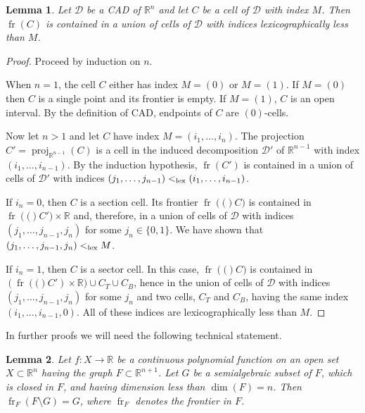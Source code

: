 \documentclass[
]{book}
\newtheorem{lemma}{Lemma}[chapter]
\theoremstyle{definition}
\theoremstyle{definition}
\theoremstyle{definition}
\theoremstyle{definition}
\theoremstyle{remark}
\begin{document}
\begin{lemma}
\protect\hypertarget{lem:novel-frontier-fr-lex-less}{}\label{lem:novel-frontier-fr-lex-less}Let \(\mathcal{D}\) be a CAD of \(\mathbb{R}^n\) and let \(C\) be a cell of \(\mathcal{D}\) with index \(M\).
Then \({\operatorname{fr} \left( C \right)}\) is contained in a union of cells of \(\mathcal{D}\) with indices lexicographically less than \(M\).
\end{lemma}

\begin{proof}
Proceed by induction on \(n\).

When \(n=1\), the cell \(C\) either has index \(M=(0)\) or \(M=(1)\).
If \(M=(0)\) then \(C\) is a single point and its frontier is empty.
If \(M=(1)\), \(C\) is an open interval. By the definition of CAD, endpoints of \(C\) are \((0)\)-cells.

Now let \(n>1\) and let \(C\) have index \(M=(i_1,\ldots,i_n)\).
The projection \(C'=\operatorname{proj}_{\mathbb{R}^{n-1}}(C)\) is a cell in the induced decomposition \(\mathcal{D'}\) of \(\mathbb{R}^{n-1}\)
with index \((i_1,\ldots,i_{n-1})\).
By the induction hypothesis, \({\operatorname{fr} \left( C' \right)}\) is contained in a union of cells of \(\mathcal{D'}\) with indices
\((j_1,\ldots,j_{n-1}) <_{\rm{lex}}(i_1,\ldots,i_{n-1})\).

If \(i_n=0\), then \(C\) is a section cell.
Its frontier \({\operatorname{fr} \left( ( \right)}C)\) is contained in \({\operatorname{fr} \left( ( \right)}C') \times \mathbb{R}\) and, therefore, in a union of
cells of \(\mathcal D\) with indices \((j_1,\ldots,j_{n-1}, j_n)\) for some \(j_n \in \{ 0,1 \}\). We have shown that \((j_1,\ldots,j_{n-1}, j_n) <_{\rm{lex}}M\).

If \(i_n=1\), then \(C\) is a sector cell.
In this case, \({\operatorname{fr} \left( ( \right)}C)\) is contained in \(({\operatorname{fr} \left( ( \right)}C') \times \mathbb{R}) \cup C_T \cup C_B\), hence in the
union of cells of \(\mathcal D\) with indices \((j_1,\ldots,j_{n-1}, j_n)\) for some \(j_n\)
and two cells, \(C_T\) and \(C_B\), having the same index \((i_1,\ldots,i_{n-1},0)\).
All of these indices are lexicographically less than \(M\).
\end{proof}

In further proofs we will need the following technical statement.

\begin{lemma}
\protect\hypertarget{lem:novel-frontier-section-split}{}\label{lem:novel-frontier-section-split}Let \(f: X \to \mathbb{R}\) be a continuous polynomial function on an open set
\(X \subset \mathbb{R}^n\) having the graph \(F \subset \mathbb{R}^{n+1}\).
Let \(G\) be a semialgebraic subset of \(F\), which is closed in \(F\), and having dimension less than \(\dim (F)=n\).
Then \({\operatorname{fr}_{F} \left( F \setminus G \right)} = G\), where \(\operatorname{fr}_{F}\) denotes the frontier in \(F\).
\end{lemma}
\end{document}
